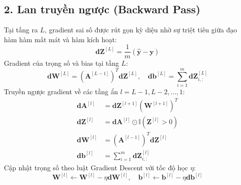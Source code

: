 \documentclass[12pt,a4paper]{report}
\begin{document}
\subsection{2. Lan truyền ngược (Backward Pass)}
Tại tầng ra $L$, gradient sai số được rút gọn kỳ diệu nhờ sự triệt tiêu giữa đạo hàm hàm mất mát và hàm kích hoạt:
\begin{equation}
    \mathbf{dZ}^{[L]} = \frac{1}{m} \left( \hat{\mathbf{y}} - \mathbf{y} \right)
\end{equation}
Gradient của trọng số và bias tại tầng $L$:
\begin{equation}
    \mathbf{dW}^{[L]} = (\mathbf{A}^{[L-1]})^T \mathbf{dZ}^{[L]}, \quad \mathbf{db}^{[L]} = \sum_{i=1}^m \mathbf{dZ}^{[L]}_{i, :}
\end{equation}
Truyền ngược gradient về các tầng ẩn $l = L-1, L-2, \dots, 1$:
\begin{align}
    \mathbf{dA}^{[l]} &= \mathbf{dZ}^{[l+1]} (\mathbf{W}^{[l+1]})^T \\
    \mathbf{dZ}^{[l]} &= \mathbf{dA}^{[l]} \odot \mathbb{I}(\mathbf{Z}^{[l]} > 0) \\
    \mathbf{dW}^{[l]} &= (\mathbf{A}^{[l-1]})^T \mathbf{dZ}^{[l]} \\
    \mathbf{db}^{[l]} &= \sum_{i=1}^m \mathbf{dZ}^{[l]}_{i, :}
\end{align}
Cập nhật trọng số theo luật Gradient Descent với tốc độ học $\eta$:
\begin{equation}
    \mathbf{W}^{[l]} \leftarrow \mathbf{W}^{[l]} - \eta \mathbf{dW}^{[l]}, \quad \mathbf{b}^{[l]} \leftarrow \mathbf{b}^{[l]} - \eta \mathbf{db}^{[l]}
\end{equation}
\end{document}
